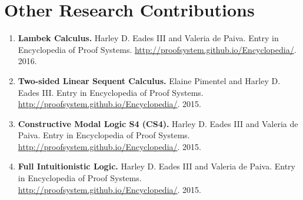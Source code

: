 \documentclass[11pt]{article}
\begin{document}
    \section{Other Research Contributions}
    \label{subsec:other_work}
    \begin{enumerate}
    \item[] \textbf{Lambek Calculus.} Harley D. Eades III and Valeria de
      Paiva. Entry in Encyclopedia of Proof
      Systems. \url{http://proofsystem.github.io/Encyclopedia/}. 2016.

    \item[] \textbf{Two-sided Linear Sequent Calculus.} Elaine Pimentel and Harley D. Eades III. Entry in Encyclopedia of Proof Systems. \url{http://proofsystem.github.io/Encyclopedia/}. 2015.

    \item[] \textbf{Constructive Modal Logic S4 (CS4).} Harley D. Eades III and Valeria de Paiva. Entry in Encyclopedia of Proof Systems. \url{http://proofsystem.github.io/Encyclopedia/}. 2015.

    \item[] \textbf{Full Intuitionistic Logic.} Harley D. Eades III and Valeria de Paiva. Entry in Encyclopedia of Proof Systems. \url{http://proofsystem.github.io/Encyclopedia/}. 2015.
    \end{enumerate}
\end{document}
